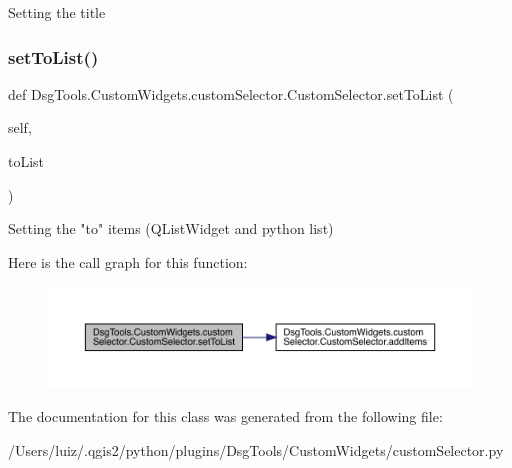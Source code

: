 \begin{DoxyVerb}Setting the title
\end{DoxyVerb}
 \mbox{\label{class_dsg_tools_1_1_custom_widgets_1_1custom_selector_1_1_custom_selector_a4c61d9303e0a18cdb81d2d0a845cf4d6}} 
\subsubsection{\texorpdfstring{set\+To\+List()}{setToList()}}
{\footnotesize\ttfamily def Dsg\+Tools.\+Custom\+Widgets.\+custom\+Selector.\+Custom\+Selector.\+set\+To\+List (\begin{DoxyParamCaption}\item[{}]{self,  }\item[{}]{to\+List }\end{DoxyParamCaption})}

\begin{DoxyVerb}Setting the "to" items (QListWidget and python list)
\end{DoxyVerb}
 Here is the call graph for this function\+:
\nopagebreak
\begin{figure}[H]
\begin{center}
\leavevmode
\includegraphics[width=350pt]{class_dsg_tools_1_1_custom_widgets_1_1custom_selector_1_1_custom_selector_a4c61d9303e0a18cdb81d2d0a845cf4d6_cgraph}
\end{center}
\end{figure}


The documentation for this class was generated from the following file\+:\begin{DoxyCompactItemize}
\item 
/\+Users/luiz/.\+qgis2/python/plugins/\+Dsg\+Tools/\+Custom\+Widgets/custom\+Selector.\+py\end{DoxyCompactItemize}
